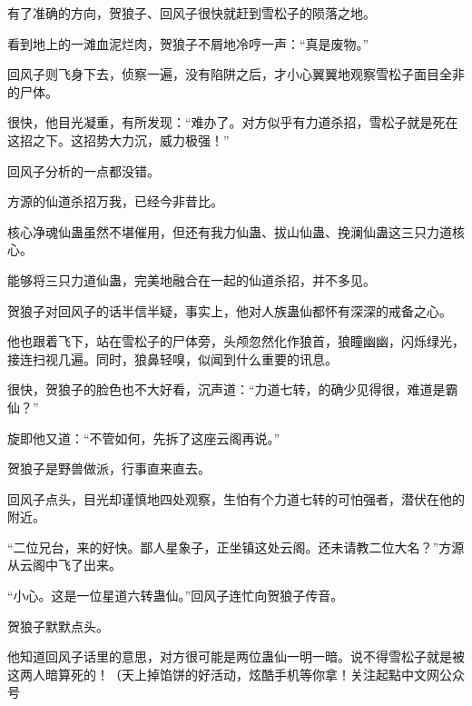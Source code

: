 \begin{this_body}
有了准确的方向，贺狼子、回风子很快就赶到雪松子的陨落之地。

看到地上的一滩血泥烂肉，贺狼子不屑地冷哼一声：“真是废物。”

回风子则飞身下去，侦察一遍，没有陷阱之后，才小心翼翼地观察雪松子面目全非的尸体。

很快，他目光凝重，有所发现：“难办了。对方似乎有力道杀招，雪松子就是死在这招之下。这招势大力沉，威力极强！”

回风子分析的一点都没错。

方源的仙道杀招万我，已经今非昔比。

核心净魂仙蛊虽然不堪催用，但还有我力仙蛊、拔山仙蛊、挽澜仙蛊这三只力道核心。

能够将三只力道仙蛊，完美地融合在一起的仙道杀招，并不多见。

贺狼子对回风子的话半信半疑，事实上，他对人族蛊仙都怀有深深的戒备之心。

他也跟着飞下，站在雪松子的尸体旁，头颅忽然化作狼首，狼瞳幽幽，闪烁绿光，接连扫视几遍。同时，狼鼻轻嗅，似闻到什么重要的讯息。

很快，贺狼子的脸色也不大好看，沉声道：“力道七转，的确少见得很，难道是霸仙？”

旋即他又道：“不管如何，先拆了这座云阁再说。”

贺狼子是野兽做派，行事直来直去。

回风子点头，目光却谨慎地四处观察，生怕有个力道七转的可怕强者，潜伏在他的附近。

“二位兄台，来的好快。鄙人星象子，正坐镇这处云阁。还未请教二位大名？”方源从云阁中飞了出来。

“小心。这是一位星道六转蛊仙。”回风子连忙向贺狼子传音。

贺狼子默默点头。

他知道回风子话里的意思，对方很可能是两位蛊仙一明一暗。说不得雪松子就是被这两人暗算死的！（天上掉馅饼的好活动，炫酷手机等你拿！关注起點中文网公众号

\end{this_body}

